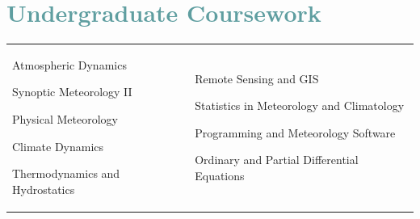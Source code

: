 \documentclass[margin,line,palatino,courier,10pt]{res}
\newenvironment{list1}{
  \begin{list}{\ding{113}}{%
      \setlength{\itemsep}{0in}
      \setlength{\parsep}{0in} \setlength{\parskip}{0in}
      \setlength{\topsep}{0in} \setlength{\partopsep}{0in}
      \setlength{\leftmargin}{0.17in}}}{\end{list}}
\begin{document}
\begin{resume}
\begin{tabular}{@{}p{2.2in}p{3in}}
\end{tabular}

\newpage
\section{\sc \textcolor{CadetBlue}{\large{Undergraduate Coursework}}}

\begin{tabular}{@{}p{2.2in}p{3in}}
\vspace*{0.04in}
\begin{list1}
\item Atmospheric Dynamics
\item Synoptic Meteorology II
\item Physical Meteorology
\item Climate Dynamics
\item Thermodynamics and Hydrostatics 
\end{list1}
&
\begin{list1}
\item Remote Sensing and GIS
\item Statistics in Meteorology and Climatology
\item Programming and Meteorology Software
\item Ordinary and Partial Differential Equations
\end{list1}

\end{tabular}


\vspace{-0.1in}
\noindent\makebox[\linewidth][r]{\rule{\textwidth}{5pt}}
\vspace{-0.3in}


\end{resume}
\end{document}
